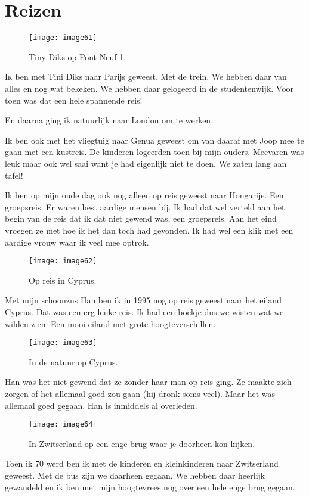 \chapter*{Reizen}

\begin{figure}[h]
    \texttt{[image: image61]}
    \caption{Tiny Diks op Pont Neuf 1.}
\end{figure}

\lettrine[lines=2, loversize=0.3, lraise=0]{\initfamily I}{k} ben met Tini Diks naar Parijs geweest. Met de trein. We hebben daar van alles en nog wat bekeken. We hebben daar gelogeerd in de studentenwijk. Voor toen was dat een hele spannende reis!

En daarna ging ik natuurlijk naar London om te werken.

Ik ben ook met het vliegtuig naar Genua geweest om van daaraf met Joop mee te gaan met een kustreis. De kinderen logeerden toen bij mijn ouders. Meevaren was leuk maar ook wel saai want je had eigenlijk niet te doen. We zaten lang aan tafel!

Ik ben op mijn oude dag ook nog alleen op reis geweest naar Hongarije. Een groepsreis. Er waren best aardige mensen bij. Ik had dat wel verteld aan het begin van de reis dat ik dat niet gewend was, een groepsreis. Aan het eind vroegen ze met hoe ik het dan toch had gevonden. Ik had wel een klik met een aardige vrouw waar ik veel mee optrok. 

\begin{figure}[h]
    \texttt{[image: image62]}
    \caption{Op reis in Cyprus.}
\end{figure}

Met mijn schoonzus Han ben ik in 1995 nog op reis geweest naar het eiland Cyprus. Dat was een erg leuke reis. Ik had een boekje dus we wisten wat we wilden zien. Een mooi eiland met grote hoogteverschillen.

\begin{figure}[h]
    \texttt{[image: image63]}
    \caption{In de natuur op Cyprus.}
\end{figure}

Han was het niet gewend dat ze zonder haar man op reis ging. Ze maakte zich zorgen of het allemaal goed zou gaan (hij dronk soms veel). Maar het was allemaal goed gegaan. Han is inmiddels al overleden. 

\begin{figure}[h]
    \texttt{[image: image64]}
    \caption{In Zwitserland op een enge brug waar je doorheen kon kijken.}
\end{figure}
Toen ik 70 werd ben ik met de kinderen en kleinkinderen naar Zwitserland geweest. Met de bus zijn we daarheen gegaan. We hebben daar heerlijk gewandeld en ik ben met mijn hoogtevrees nog over een hele enge brug gegaan. 

